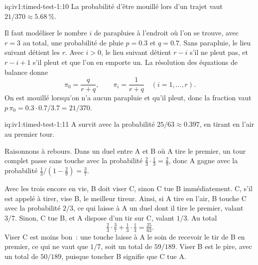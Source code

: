 \newpage
\begin{solution}{iq:iv1:timed-test-1:10}
La probabilité d'être mouillé lors d'un trajet vaut $21/370 \approx 5.68~\%$.

Il faut modéliser le nombre $i$ de parapluies à l'endroit où l'on se trouve, avec $r = 3$ au total, une probabilité de pluie $p = 0.3$ et $q = 0.7$. Sans parapluie, le lieu suivant détient les $r$. Avec $i > 0$, le lieu suivant détient $r - i$ s'il ne pleut pas, et $r - i + 1$ s'il pleut et que l'on en emporte un. La résolution des équations de balance donne
\[
\pi_0 = \frac{q}{r + q}, \qquad \pi_i = \frac{1}{r + q} \quad (i = 1, \dots, r).
\]
On est mouillé lorsqu'on n'a aucun parapluie et qu'il pleut, donc la fraction vaut $p\,\pi_0 = 0.3 \cdot 0.7/3.7 = 21/370$.

\end{solution}

\begin{solution}{iq:iv1:timed-test-1:11}
A survit avec la probabilité $25/63 \approx 0.397$, en tirant en l'air au premier tour.

Raisonnons à rebours. Dans un duel entre A et B où A tire le premier, un tour complet passe sans touche avec la probabilité $\tfrac23 \cdot \tfrac13 = \tfrac29$, donc A gagne avec la probabilité $\tfrac13/(1 - \tfrac29) = \tfrac37$.

Avec les trois encore en vie, B doit viser C, sinon C tue B immédiatement. C, s'il est appelé à tirer, vise B, le meilleur tireur. Ainsi, si A tire en l'air, B touche C avec la probabilité $2/3$, ce qui laisse à A un duel dont il tire le premier, valant $3/7$. Sinon, C tue B, et A dispose d'un tir sur C, valant $1/3$. Au total
\[
\tfrac23 \cdot \tfrac37 + \tfrac13 \cdot \tfrac13 = \tfrac{25}{63}.
\]
Viser C est moins bon~: une touche laisse à A le soin de recevoir le tir de B en premier, ce qui ne vaut que $1/7$, soit un total de $59/189$. Viser B est le pire, avec un total de $50/189$, puisque toucher B signifie que C tue A.

\end{solution}

